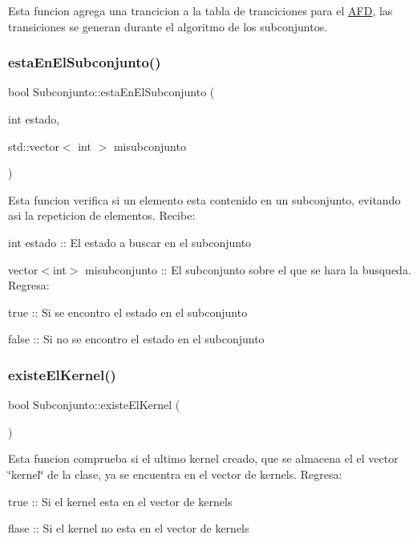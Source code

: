 Esta funcion agrega una trancicion a la tabla de tranciciones para el \hyperlink{class_a_f_d}{A\+FD}, las transiciones se generan durante el algoritmo de los subconjuntos. \mbox{\label{class_subconjunto_adb94befff9d815d5f05d4175a68b3371}} 
\subsubsection{\texorpdfstring{esta\+En\+El\+Subconjunto()}{estaEnElSubconjunto()}}
{\footnotesize\ttfamily bool Subconjunto\+::esta\+En\+El\+Subconjunto (\begin{DoxyParamCaption}\item[{int}]{estado,  }\item[{std\+::vector$<$ int $>$}]{misubconjunto }\end{DoxyParamCaption})}

Esta funcion verifica si un elemento esta contenido en un subconjunto, evitando asi la repeticion de elementos. Recibe\+:
\begin{DoxyItemize}
\item int estado \+:\+: El estado a buscar en el subconjunto
\item vector$<$int$>$ misubconjunto \+:\+: El subconjunto sobre el que se hara la busqueda. Regresa\+:
\item true \+:\+: Si se encontro el estado en el subconjunto
\item false \+:\+: Si no se encontro el estado en el subconjunto 
\end{DoxyItemize}\mbox{\label{class_subconjunto_af63dd50101bf38f6192adc52bd7615a7}} 
\subsubsection{\texorpdfstring{existe\+El\+Kernel()}{existeElKernel()}}
{\footnotesize\ttfamily bool Subconjunto\+::existe\+El\+Kernel (\begin{DoxyParamCaption}{ }\end{DoxyParamCaption})}

Esta funcion comprueba si el ultimo kernel creado, que se almacena el el vector \char`\"{}kernel\char`\"{} de la clase, ya se encuentra en el vector de kernels. Regresa\+:
\begin{DoxyItemize}
\item true \+:\+: Si el kernel esta en el vector de kernels
\item flase \+:\+: Si el kernel no esta en el vector de kernels 
\end{DoxyItemize}\mbox{\label{class_subconjunto_aebb67390c197c1b98c9fe29835e7b8e5}} 
